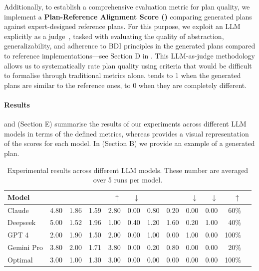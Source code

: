 Additionally,
to establish a comprehensive evaluation metric for plan quality,
we implement a \textbf{Plan-Reference Alignment Score (\PRAS{})} comparing generated plans against expert-designed reference plans.
%
For this purpose,
we exploit an LLM explicitly as a judge~\cite{DBLP:journals/corr/abs-2412-05579},
tasked with evaluating the quality of abstraction, generalizability,
and adherence to BDI principles in the generated plans compared to reference implementations---see Section D in \cite{ZenodoSupplementaryMaterial}.
%
This LLM-as-judge methodology allows us to systematically rate plan quality using criteria that
would be difficult to formalise through traditional metrics alone.
%
\PRAS{} tends to 1 when the generated plans are similar to the reference ones,
to 0 when they are completely different.

\paragraph{Results}
 and \cite{ZenodoSupplementaryMaterial} (Section E) summarise the results of our experiments across different LLM models in terms of the defined metrics,
whereas  provides a visual representation of the \PRAS{} scores for each model.
%
In \cite{ZenodoSupplementaryMaterial} (Section B) we provide an example of a generated plan.
\begin{table}[t]
    \centering
        \caption{Experimental results across different LLM models. These number are averaged over 5 runs per model.}
        \label{tab:experiments}
        \footnotesize
        \begin{tabular}{@{}l@{\;}|r@{\;}r@{\;}r@{\;}r@{\;}r@{\;}r@{\;}r@{\;}r@{\;}r@{\;}|r@{\;}r@{\;}}
            \toprule
             \textbf{Model} & \PC{} & \CC{} & \PBC{} & \GR{} $\uparrow$ & \RA{} $\downarrow$ & \NGC{} & \NBC{} & \GSM{} $\downarrow$ & \BSM{} $\downarrow$ & \TSR{} $\uparrow$\\  \midrule
            Claude & 4.80 & 1.86 & 1.59 & 2.80 & 0.00 & 0.80 & 0.20 & 0.00 & 0.00 & 60\% & \\
            Deepseek & 5.00 & 1.52 & 1.96 & 1.00 & 0.40 & 1.20 & 1.60 & 0.20 & 1.00 & 40\% &  \\
            GPT 4 & 2.00 & 1.90 & 1.50 & 2.00 & 0.00 & 1.00 & 0.00 & 1.00 & 0.00 & 100\% \\
            Gemini Pro & 3.80 & 2.00 & 1.71 & 3.80 & 0.00 & 0.20 & 0.80 & 0.00 & 0.00 & 20\% \\
            \midrule
            Optimal & 3.00 & 1.00 & 1.30 & 3.00 & 0.00 & 0.00 & 0.00 & 0.00 & 0.00 & 100\% \\
            \bottomrule
        \end{tabular}
\end{table}
